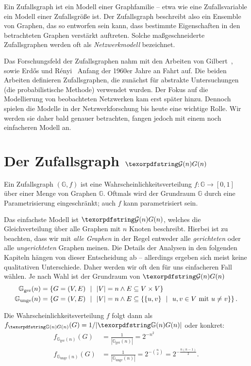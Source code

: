 Ein Zufallsgraph ist ein Modell einer Graphfamilie -- etwa wie eine Zufallsvariable ein Modell einer Zufallsgröße ist.
Der Zufallsgraph beschreibt also ein Ensemble von Graphen, das so entworfen sein kann, dass bestimmte Eigenschaften in den betrachteten Graphen verstärkt auftreten.
Solche maßgeschneiderte Zufallsgraphen werden oft als \emph{Netzwerkmodell} bezeichnet.

Das Forschungsfeld der Zufallsgraphen nahm mit den Arbeiten von Gilbert~\cite{gilbert_1959}, sowie Erd\H{o}s und R\'enyi~\cite{erdos_renyi_1960} Anfang der 1960er Jahre an Fahrt auf.
Die beiden Arbeiten definieren Zufallsgraphen, die zunächst für abstrakte Untersuchungen (\zB die probabilistische Methode) verwendet wurden.
Der Fokus auf die Modellierung von beobachteten Netzwerken kam erst später hinzu.
Dennoch spielen die Modelle in der Netzwerkforschung bis heute eine wichtige Rolle.
Wir werden sie daher bald genauer betrachten, fangen jedoch mit einem noch einfacheren Modell an.

\section{Der Zufallsgraph $\Gn$}
Ein Zufallsgraph $(\mathbb G, f)$ ist eine Wahrscheinlichkeitsverteilung $f\colon \mathbb G \to [0, 1]$ über einer Menge von Graphen $\mathbb G$.
Oftmals wird der Grundraum $\mathbb G$ durch eine Parametrisierung eingeschränkt; auch $f$ kann parametrisiert sein.

Das  einfachste Modell ist $\Gn$, welches die Gleichverteilung über alle Graphen mit $n$ Knoten beschreibt.
Hierbei ist zu beachten, dass wir mit \emph{alle Graphen} in der Regel entweder alle \emph{gerichteten} oder alle \emph{ungerichteten} Graphen meinen.
Die Details der Analysen in den folgenden Kapiteln hängen von dieser Entscheidung ab -- allerdings ergeben sich meist keine qualitativen Unterschiede.
Daher werden wir oft den für uns einfacheren Fall wählen.
Je nach Wahl ist der Grundraum von $\Gn$
\begin{align}
    \mathbb G_\text{ger}(n)  & =
    \left\{ G = (V,E) \ \ \middle|\ \ |V| = n \land E \subseteq V \times V \right\} \\\label{eq:gerichtet_gn}
    \mathbb G_\text{unge}(n) & =
    \left\{ G = (V,E) \ \ \middle|\ \ |V| = n \land  E \subseteq \left\{ \left\{u,v\right\} \ \ \middle|\ \ u,v \in V \text{ mit } u \ne v \right\} \right\}.
\end{align}

\noindent Die Wahrscheinlichkeitsverteilung $f$ folgt dann als $f_{\gGn}(G) = 1 / | \gGn |$ oder konkret:
\begin{align}
    f_{\mathbb G_\text{ger}(n)}(G)  & =  \frac{1}{| \mathbb G_\text{ger}(n) |} = 2^{-n^2}\label{eq:gleichverteilt_gerichtet_gn} \\
    f_{\mathbb G_\text{unge}(n)}(G) & =  \frac{1}{| \mathbb G_\text{unge}(n) |} = 2^{-\binom n 2} = 2^{-\frac{n(n-1)}{2}}.
\end{align}

